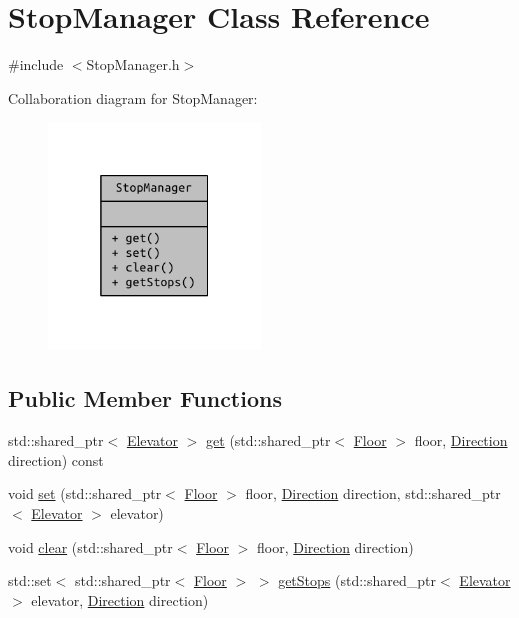 \hypertarget{class_stop_manager}{}\section{Stop\+Manager Class Reference}
\label{class_stop_manager}


{\ttfamily \#include $<$Stop\+Manager.\+h$>$}



Collaboration diagram for Stop\+Manager\+:
\nopagebreak
\begin{figure}[H]
\begin{center}
\leavevmode
\includegraphics[width=160pt]{class_stop_manager__coll__graph}
\end{center}
\end{figure}
\subsection*{Public Member Functions}
\begin{DoxyCompactItemize}
\item 
std\+::shared\+\_\+ptr$<$ \hyperlink{class_elevator}{Elevator} $>$ \hyperlink{class_stop_manager_adab473b58ab3505cbf849b9f05939637}{get} (std\+::shared\+\_\+ptr$<$ \hyperlink{class_floor}{Floor} $>$ floor, \hyperlink{_direction_8h_a224b9163917ac32fc95a60d8c1eec3aa}{Direction} direction) const 
\item 
void \hyperlink{class_stop_manager_a2c22b4194c71d20793efbb69be1ba548}{set} (std\+::shared\+\_\+ptr$<$ \hyperlink{class_floor}{Floor} $>$ floor, \hyperlink{_direction_8h_a224b9163917ac32fc95a60d8c1eec3aa}{Direction} direction, std\+::shared\+\_\+ptr$<$ \hyperlink{class_elevator}{Elevator} $>$ elevator)
\item 
void \hyperlink{class_stop_manager_aa96aaa6138287dc5aec23ece32fccf8e}{clear} (std\+::shared\+\_\+ptr$<$ \hyperlink{class_floor}{Floor} $>$ floor, \hyperlink{_direction_8h_a224b9163917ac32fc95a60d8c1eec3aa}{Direction} direction)
\item 
std\+::set$<$ std\+::shared\+\_\+ptr$<$ \hyperlink{class_floor}{Floor} $>$ $>$ \hyperlink{class_stop_manager_a17f374de474e4de6ba1488220dcc7c72}{get\+Stops} (std\+::shared\+\_\+ptr$<$ \hyperlink{class_elevator}{Elevator} $>$ elevator, \hyperlink{_direction_8h_a224b9163917ac32fc95a60d8c1eec3aa}{Direction} direction)
\end{DoxyCompactItemize}


